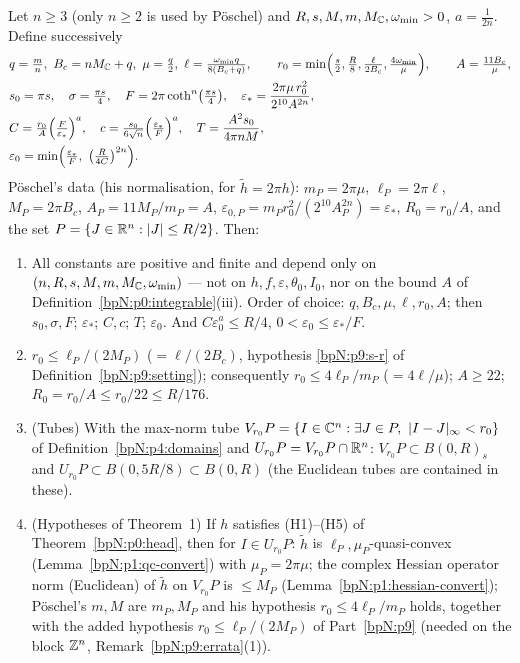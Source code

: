 \begin{lemma}\label{bpN:p1:constants}
Let $n\ge3$ (only $n\ge2$ is used by P\"oschel) and $R,s,M,m,M_{\mathbb{C}},\omega_{\min}>0$, $a=\frac1{2n}$. Define successively
\begin{align*}
&q=\tfrac mn,\ B_c=nM_\C+q,\ \mu=\tfrac q2,\ \ell=\tfrac{\omega_{\min}q}{8(B_c+q)},\qquad r_0=\min\Bigl(\tfrac s2,\tfrac R8,\tfrac{\ell}{2B_c},\tfrac{4\omega_{\min}}\mu\Bigr),\qquad A=\tfrac{11B_c}\mu,\\
&s_0=\pi s,\quad\sigma=\tfrac{\pi s}4,\quad F=2\pi\coth^n\bigl(\tfrac{\pi s}4\bigr),\quad\varepsilon_*=\frac{2\pi\mu\,r_0^2}{2^{10}A^{2n}},\\
&C=\tfrac{r_0}A\Bigl(\tfrac F{\varepsilon_*}\Bigr)^a,\quad c=\tfrac{s_0}{6\sqrt n}\Bigl(\tfrac{\varepsilon_*}F\Bigr)^a,\quad T=\frac{A^2s_0}{4\pi nM},\\
&\varepsilon_0=\min\Bigl(\tfrac{\varepsilon_*}F,\ \bigl(\tfrac R{4C}\bigr)^{2n}\Bigr).
\end{align*}
P\"oschel's data (his normalisation, for $\tilde h=2\pi h$): $m_P=2\pi\mu$, $\ell_P=2\pi\ell$, $M_P=2\pi B_c$, $A_P=11M_P/m_P=A$, $\varepsilon_{0,P}=m_Pr_0^2/(2^{10}A_P^{2n})=\varepsilon_*$, $R_0=r_0/A$, and the set $P=\{J\in\mathbb{R}^n:\lvert J\rvert\le R/2\}$.
Then:
\begin{enumerate}[label=(\alph*)]
\item All constants are positive and finite and depend only on $(n,R,s,M,m,M_{\mathbb{C}},\omega_{\min})$ --- not on $h,f,\varepsilon,\theta_0,I_0$, nor on the bound $A$ of Definition~\ref{bpN:p0:integrable}(iii). Order of choice: $q,B_c,\mu,\ell,r_0,A$; then $s_0,\sigma,F$; $\varepsilon_*$; $C,c$; $T$; $\varepsilon_0$. And $C\varepsilon_0^{a}\le R/4$, $0<\varepsilon_0\le\varepsilon_*/F$.
\item $r_0\le\ell_P/(2M_P)$ ($=\ell/(2B_c)$, hypothesis \ref{bpN:p9:s-r} of Definition~\ref{bpN:p9:setting}); consequently $r_0\le4\ell_P/m_P$ ($=4\ell/\mu$); $A\ge22$; $R_0=r_0/A\le r_0/22\le R/176$.
\item (Tubes) With the max-norm tube $V_{r_0}P=\{I\in\C^n:\exists J\in P,\ \abs{I-J}_\infty<r_0\}$ of Definition~\ref{bpN:p4:domains} and $U_{r_0}P=V_{r_0}P\cap\mathbb{R}^n$: $V_{r_0}P\subset B(0,R)_s$ and $U_{r_0}P\subset B(0,5R/8)\subset B(0,R)$ (the Euclidean tubes are contained in these).
\item (Hypotheses of Theorem~1) If $h$ satisfies (H1)--(H5) of Theorem~\ref{bpN:p0:head}, then for $I\in U_{r_0}P$: $\tilde h$ is $\ell_P,\mu_P$-quasi-convex (Lemma~\ref{bpN:p1:qc-convert}) with $\mu_P=2\pi\mu$; the complex Hessian operator norm (Euclidean) of $\tilde h$ on $V_{r_0}P$ is $\le M_P$ (Lemma~\ref{bpN:p1:hessian-convert}); P\"oschel's $m,M$ are $m_P,M_P$ and his hypothesis $r_0\le4\ell_P/m_P$ holds, together with the added hypothesis $r_0\le\ell_P/(2M_P)$ of Part~\ref{bpN:p9} (needed on the block $\mathbb{Z}^n$, Remark~\ref{bpN:p9:errata}(1)).

\end{enumerate}
\end{lemma}
